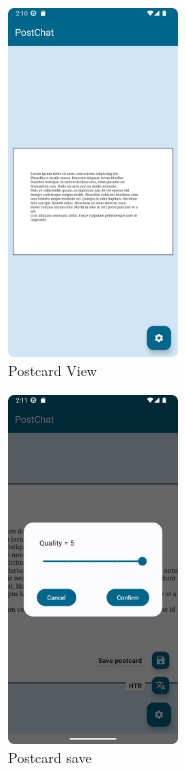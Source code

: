 \begin{figure}[!ht]
	\centering
	\includegraphics[trim={0cm -3cm 0 -3cm}, width=0.4\textwidth]{./Chapter6/Figures/PostcardActivity}
	\caption{Postcard View}
	\label{fig:VA}
\end{figure}


\begin{figure}[!ht]
	\centering
	\includegraphics[trim={0cm -3cm 0 -3cm}, width=0.4\textwidth]{./Chapter6/Figures/PostcardActivitySave}
	\caption{Postcard save}
	\label{fig:VA1}
\end{figure}

